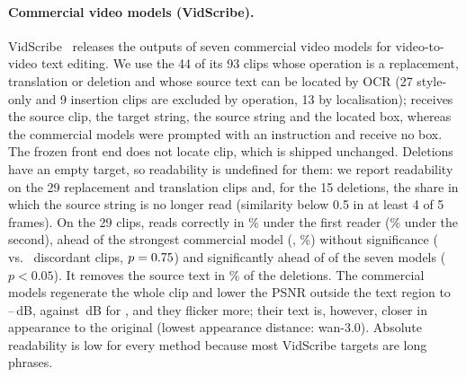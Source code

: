 \paragraph{Commercial video models (VidScribe).} VidScribe~\cite{vidscribe2026} releases the outputs of seven commercial video models for video-to-video text editing. We use the 44 of its 93 clips whose operation is a replacement, translation or deletion and whose source text can be located by OCR (27 style-only and 9 insertion clips are excluded by operation, 13 by localisation); \method receives the source clip, the target string, the source string and the located box, whereas the commercial models were prompted with an instruction and receive no box. The frozen front end does not locate \xVsFails{} clip, which is shipped unchanged. Deletions have an empty target, so readability is undefined for them: we report readability on the 29 replacement and translation clips and, for the 15 deletions, the share in which the source string is no longer read (similarity below 0.5 in at least 4 of 5 frames). On the 29 clips, \method reads correctly in \xVsOurs\% under the first reader (\xVsOursIvl\% under the second), ahead of the strongest commercial model (\xVsBestName, \xVsBest\%) without significance (\xVsBestOnlyOurs{} vs.\ \xVsBestOnlyThem{} discordant clips, $p=0.75$) and significantly ahead of \xVsSig{} of the seven models ($p<0.05$). It removes the source text in \xVsOursRem\% of the deletions. The commercial models regenerate the whole clip and lower the PSNR outside the text region to \xVsBGLo--\xVsBGHi\,dB, against \xVsOursBG\,dB for \method, and they flicker more; their text is, however, closer in appearance to the original (lowest appearance distance: wan-3.0). Absolute readability is low for every method because most VidScribe targets are long phrases.
